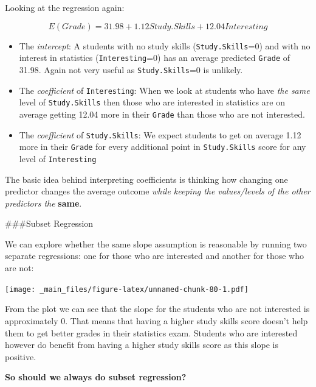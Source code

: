 \documentclass[
]{gitbook}
\providecommand{\tightlist}{%
  \setlength{\itemsep}{0pt}\setlength{\parskip}{0pt}}
\begin{document}
Looking at the regression again:

\[ E(Grade) =31.98 + 1.12 Study.Skills + 12.04 Interesting \]

\begin{itemize}
\tightlist
\item
  The \emph{intercept}: A students with no study skills (\texttt{Study.Skills}=0) and with no interest in statistics (\texttt{Interesting}=0) has an average predicted \texttt{Grade} of 31.98. Again not very useful as \texttt{Study.Skills}=0 is unlikely.
\item
  The \emph{coefficient} of \texttt{Interesting}: When we look at students who have \emph{the same} level of \texttt{Study.Skills} then those who are interested in statistics are on average getting 12.04 more in their \texttt{Grade} than those who are not interested.
\item
  The \emph{coefficient} of \texttt{Study.Skills}: We expect students to get on average 1.12 more in their \texttt{Grade} for every additional point in \texttt{Study.Skills} score for any level of \texttt{Interesting}
\end{itemize}

The basic idea behind interpreting coefficients is thinking how changing one predictor changes the average outcome \emph{while keeping the values/levels of the other predictors the} \textbf{same}.

\#\#\#Subset Regression

We can explore whether the same slope assumption is reasonable by running two separate regressions: one for those who are interested and another for those who are not:

\texttt{[image: \_main\_files/figure-latex/unnamed-chunk-80-1.pdf]}


From the plot we can see that the slope for the students who are not interested is approximately 0. That means that having a higher study skills score doesn't help them to get better grades in their statistics exam. Students who are interested however do benefit from having a higher study skills score as this slope is positive.

\textbf{So should we always do subset regression?}
\end{document}
